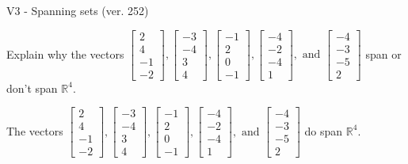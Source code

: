 \begin{exercise}
  \begin{exerciseTitle}V3 - Spanning sets (ver. 252)\end{exerciseTitle}
  \begin{exerciseStatement}
    Explain why the vectors \(\left[\begin{array}{r}
2 \\
4 \\
-1 \\
-2
\end{array}\right] , \left[\begin{array}{r}
-3 \\
-4 \\
3 \\
4
\end{array}\right] , \left[\begin{array}{r}
-1 \\
2 \\
0 \\
-1
\end{array}\right] , \left[\begin{array}{r}
-4 \\
-2 \\
-4 \\
1
\end{array}\right] , \text{ and } \left[\begin{array}{r}
-4 \\
-3 \\
-5 \\
2
\end{array}\right]\) span or don't span \(\mathbb{R}^4\). 
	


  \end{exerciseStatement}
  \begin{exerciseAnswer}
   The vectors \(\left[\begin{array}{r}
2 \\
4 \\
-1 \\
-2
\end{array}\right] , \left[\begin{array}{r}
-3 \\
-4 \\
3 \\
4
\end{array}\right] , \left[\begin{array}{r}
-1 \\
2 \\
0 \\
-1
\end{array}\right] , \left[\begin{array}{r}
-4 \\
-2 \\
-4 \\
1
\end{array}\right] , \text{ and } \left[\begin{array}{r}
-4 \\
-3 \\
-5 \\
2
\end{array}\right]\) 
  	 do  
	span \(\mathbb{R}^4\).
  



\end{exerciseAnswer}
\end{exercise}
